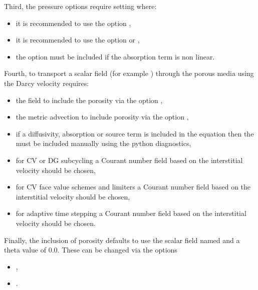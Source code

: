 Third, the pressure options require setting where:
\begin{itemize}
\item it is recommended to use the option ,
\item it is recommended to use the option  or ,
\item the option  must be included if the absorption term is non linear.
\end{itemize}

Fourth, to transport a scalar field (for example ) through the porous media using the Darcy velocity requires:
\begin{itemize}
\item the  field to include the porosity via the option ,
\item the metric advection to include porosity via the option ,
\item if a diffusivity, absorption or source term is included in the  equation then the  must be included manually using the python diagnostics,
\item for CV or DG subcycling a Courant number field based on the interstitial velocity should be chosen,
\item for CV face value schemes and limiters a Courant number field based on the interstitial velocity should be chosen, 
\item for adaptive time stepping a Courant number field based on the interstitial velocity should be chosen.
\end{itemize}

Finally, the inclusion of porosity defaults to use the scalar field named  and a theta value of $0.0$. These can be changed via the options
\begin{itemize}
\item {},
\item {}.
\end{itemize} 
